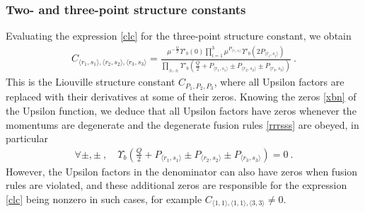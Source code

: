 \documentclass[12pt, a4paper, notitlepage, twoside]{report}
\numberwithin{equation}{section}
\theoremstyle{break}
\begin{document}
\subsubsection{Two- and three-point structure constants}

Evaluating the expression \eqref{clc} for the three-point structure constant, we obtain
\begin{align}
 C_{\langle r_1,s_1\rangle ,\langle r_2,s_2\rangle ,\langle r_3,s_3 \rangle} =   \frac{\mu^{-\frac{Q}{2}}\Upsilon'_b(0)\prod_{i=1}^3 \mu^{P_{\langle r_i,s_i \rangle}}\Upsilon'_b(2P_{\langle r_i,s_i \rangle}) }{\prod_{\pm,\pm} \Upsilon'_b\left(\tfrac{Q}{2}+P_{\langle r_1,s_1 \rangle}\pm P_{\langle r_2,s_2 \rangle} \pm P_{\langle r_3,s_3 \rangle}\right)} \ .
\label{crisi}
\end{align}
This is the Liouville structure constant $C_{P_1,P_2,P_3}$, where all Upsilon factors are replaced with their derivatives at some of their zeros.
Knowing the zeros \eqref{xbn} of the Upsilon function, we deduce that 
all Upsilon factors have zeros whenever
the momentums are degenerate and the degenerate fusion rules \eqref{rrrsss} are obeyed, in particular
\begin{align}
 \forall \pm, \pm\ , \quad \Upsilon_b\left(\tfrac{Q}{2}+P_{\langle r_1,s_1 \rangle}\pm P_{\langle r_2,s_2 \rangle} \pm P_{\langle r_3,s_3 \rangle}\right) = 0\ .
\end{align}
However, the Upsilon factors in the denominator can also have zeros when fusion rules are violated, and these additional zeros are responsible for the expression \eqref{clc} being nonzero in such cases, for example $C_{\langle 1,1\rangle , \langle 1,1 \rangle,\langle 3,3 \rangle} \neq 0$.
\end{document}
